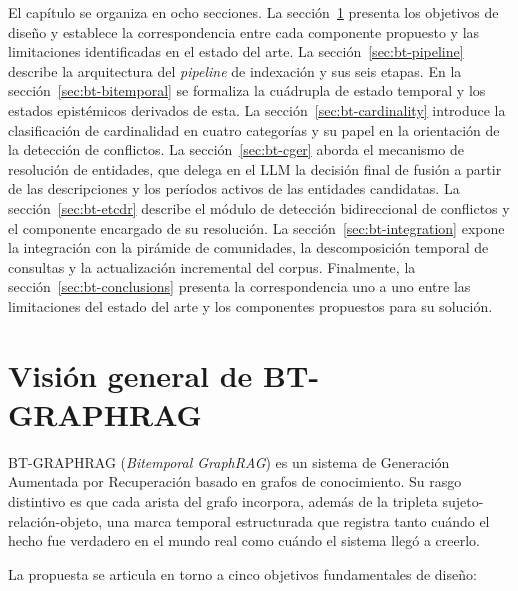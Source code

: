 El capítulo se organiza en ocho secciones. La sección~\ref{sec:bt-overview} presenta los objetivos de diseño y establece la correspondencia entre cada componente propuesto y las limitaciones identificadas en el estado del arte. La sección~\ref{sec:bt-pipeline} describe la arquitectura del \emph{pipeline} de indexación y sus seis etapas. En la sección~\ref{sec:bt-bitemporal} se formaliza la cuádrupla de estado temporal y los estados epistémicos derivados de esta. La sección~\ref{sec:bt-cardinality} introduce la clasificación de cardinalidad en cuatro categorías y su papel en la orientación de la detección de conflictos. La sección~\ref{sec:bt-cger} aborda el mecanismo de resolución de entidades, que delega en el LLM la decisión final de fusión a partir de las descripciones y los períodos activos de las entidades candidatas. La sección~\ref{sec:bt-etcdr} describe el módulo de detección bidireccional de conflictos y el componente encargado de su resolución. La sección~\ref{sec:bt-integration} expone la integración con la pirámide de comunidades, la descomposición temporal de consultas y la actualización incremental del corpus. Finalmente, la sección~\ref{sec:bt-conclusions} presenta la correspondencia uno a uno entre las limitaciones del estado del arte y los componentes propuestos para su solución.

\section{Visión general de BT-GRAPHRAG}\label{sec:bt-overview}

BT-GRAPHRAG (\emph{Bitemporal GraphRAG}) es un sistema de Generación Aumentada por Recuperación basado en grafos de conocimiento. Su rasgo distintivo es que cada arista del grafo incorpora, además de la tripleta sujeto-relación-objeto, una marca temporal estructurada que registra tanto cuándo el hecho fue verdadero en el mundo real como cuándo el sistema llegó a creerlo.

La propuesta se articula en torno a cinco objetivos fundamentales de diseño:

